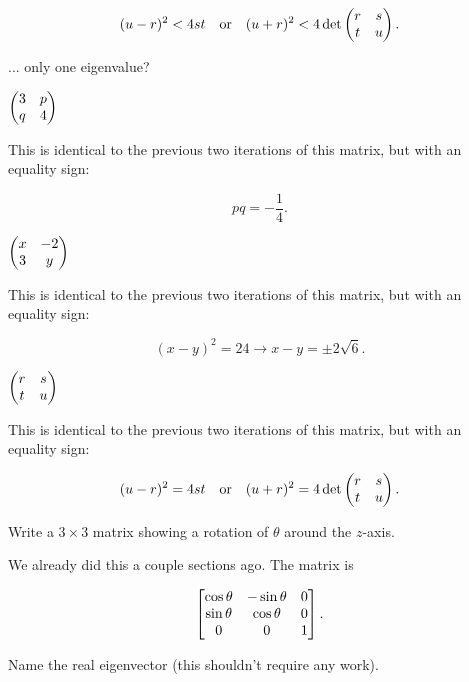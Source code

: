 \documentclass[../gatm_answers.tex]{subfiles}
\begin{document}
$$(u-r)^2 < 4st \quad\text{or}\quad (u+r)^2 < 4\det \begin{pmatrix} r & s \\ t & u \end{pmatrix}.$$

\begin{inner_problem}
\item ... only one eigenvalue?
\end{inner_problem}

\begin{iinner_problem}[start=1]
\item $\begin{pmatrix} 3 & p \\ q & 4 \end{pmatrix}$
\end{iinner_problem}

This is identical to the previous two iterations of this matrix, but with an equality sign:

$$pq = -\frac{1}{4}.$$

\begin{iinner_problem}
\item $\begin{pmatrix} x & -2 \\ 3 & y \end{pmatrix}$
\end{iinner_problem}

This is identical to the previous two iterations of this matrix, but with an equality sign:

$$(x-y)^2 = 24 \rightarrow x-y = \pm 2\sqrt{6}.$$

\begin{iinner_problem}
\item $\begin{pmatrix} r & s \\ t & u \end{pmatrix}$
\end{iinner_problem}

This is identical to the previous two iterations of this matrix, but with an equality sign:

$$(u-r)^2 = 4st \quad\text{or}\quad (u+r)^2 = 4\det \begin{pmatrix} r & s \\ t & u \end{pmatrix}.$$

\begin{outer_problem}
\item
\end{outer_problem}

\begin{inner_problem}[start=1]
\item Write a $3\times 3$ matrix showing a rotation of $\theta$ around the $z$-axis.
\end{inner_problem}

We already did this a couple sections ago. The matrix is

$$\begin{bmatrix} \cos\theta & -\sin\theta & 0 \\ \sin\theta & \cos\theta & 0 \\ 0 & 0 & 1 \end{bmatrix}.$$

\begin{inner_problem}
\item Name the real eigenvector (this shouldn't require any work).
\end{inner_problem}
\end{document}
